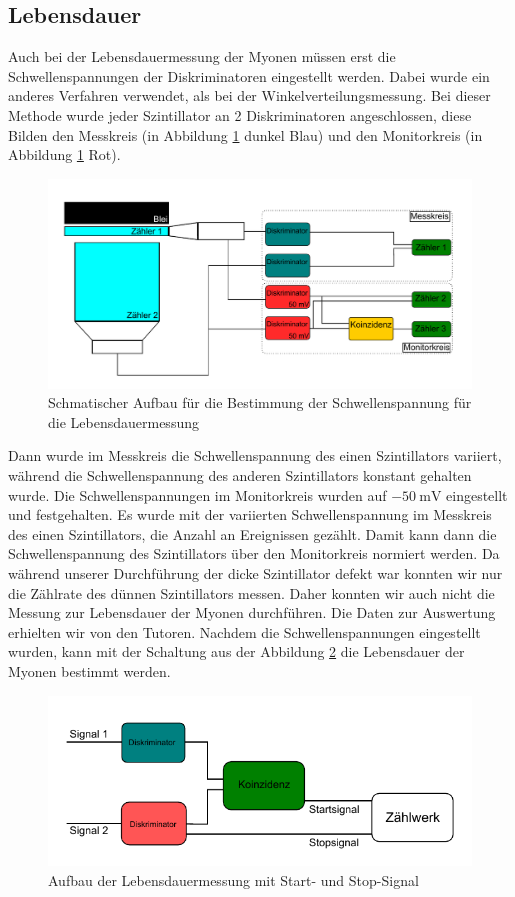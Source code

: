 \documentclass{article}
\begin{document}
\subsection{Lebensdauer}
Auch bei der Lebensdauermessung der Myonen müssen erst die Schwellenspannungen der Diskriminatoren eingestellt werden.
Dabei wurde ein anderes Verfahren verwendet, als bei der Winkelverteilungsmessung.
Bei dieser Methode wurde jeder Szintillator an 2 Diskriminatoren angeschlossen, diese Bilden den Messkreis (in Abbildung \ref{fig:AufbauLebensdauer} dunkel Blau) und den Monitorkreis (in Abbildung \ref{fig:AufbauLebensdauer} Rot).
\begin{figure}[H]
    \centering
    \includegraphics[width=1\textwidth]{figures/Aufbau_Lebensdauermessung.pdf}
    \caption{Schmatischer Aufbau für die Bestimmung der Schwellenspannung für die Lebensdauermessung}
    \label{fig:AufbauLebensdauer}
\end{figure}
Dann wurde im Messkreis die Schwellenspannung des einen Szintillators variiert, während die Schwellenspannung des anderen Szintillators konstant gehalten wurde.
Die Schwellenspannungen im Monitorkreis wurden auf $\SI{-50}{\milli\volt}$ eingestellt und festgehalten.
Es wurde mit der variierten Schwellenspannung im Messkreis des einen Szintillators, die Anzahl an Ereignissen gezählt.
Damit kann dann die Schwellenspannung des Szintillators über den Monitorkreis normiert werden. 
Da während unserer Durchführung der dicke Szintillator defekt war konnten wir nur die Zählrate des dünnen Szintillators messen.
Daher konnten wir auch nicht die Messung zur Lebensdauer der Myonen durchführen. Die Daten zur Auswertung erhielten wir von den Tutoren.
Nachdem die Schwellenspannungen eingestellt wurden, kann mit der Schaltung aus der Abbildung \ref{fig:AufbauZerfall} die Lebensdauer der Myonen bestimmt werden.
\begin{figure}[H]
    \centering
    \includegraphics[width=1\textwidth]{figures/Aufbau_Zerfallsmessung.pdf}
    \caption{Aufbau der Lebensdauermessung mit Start- und Stop-Signal}
    \label{fig:AufbauZerfall} 
\end{figure}
\end{document}
